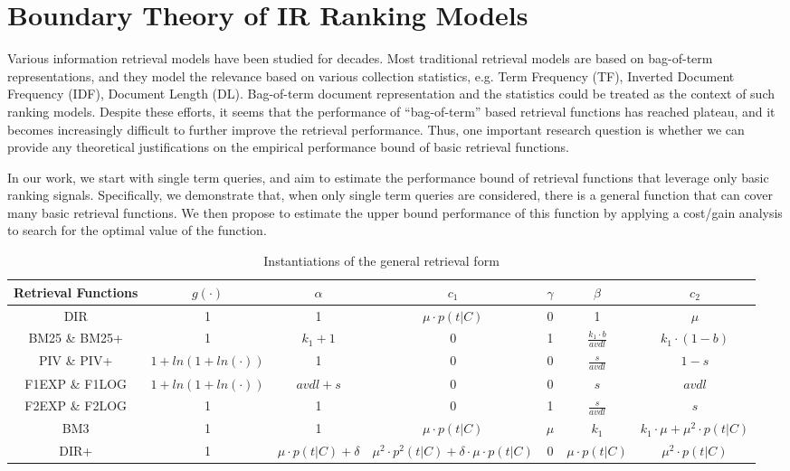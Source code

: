%
%
\chapter{Boundary Theory of IR Ranking Models}

Various information retrieval models have been studied for decades. 
Most traditional retrieval models are based on bag-of-term 
representations, and they model the relevance based on various 
collection statistics, e.g. Term Frequency (TF), 
Inverted Document Frequency (IDF), Document Length (DL). 
Bag-of-term document representation and the statistics could be 
treated as the context of such ranking models.
Despite these efforts, it seems that the performance of 
``bag-of-term'' based retrieval functions has reached plateau, 
and it becomes increasingly difficult to further improve the retrieval 
performance. Thus, one important research question is whether 
we can provide any theoretical justifications on the empirical 
performance bound of basic retrieval functions. 

In our work, we start with single term queries, and aim to
estimate the performance bound of retrieval functions that
leverage only basic ranking signals. Specifically, we demonstrate that, 
when only single term queries are considered, there is a general 
function that can cover many basic retrieval functions. We then
propose to estimate the upper bound performance of this
function by applying a cost/gain analysis to search for the
optimal value of the function.


\begin{table*}[t]
\tiny
\centering
\caption{Instantiations of the general retrieval form}
\label{tab:allmodels}
\begin{tabular}{ ccccccc } \hline
Retrieval Functions & $g(\cdot)$ & $\alpha$ & $c_1$ & $\gamma$ & $\beta$ & $c_2$ \\\hline \hline
DIR & 1 & 1 & $\mu\cdot p(t|C)$ & 0 & 1 & $\mu$ \\ \hline
BM25 \& BM25+ & 1 & $k_1+1$ & 0 & 1 & $\frac{k_1 \cdot b}{avdl}$ & $k_1 \cdot (1-b)$ \\ \hline
PIV \& PIV+ & $1+ln(1+ln(\cdot))$ & 1 & 0 & 0 & $\frac{s}{avdl}$ & $1-s$ \\ \hline
F1EXP \& F1LOG & $1+ln(1+ln(\cdot))$ & $avdl+s$ & 0 & 0 & $s$ & $avdl$ \\ \hline
F2EXP \& F2LOG & 1 & 1 & 0 & 1 & $\frac{s}{avdl}$ & $s$ \\ \hline
BM3 & 1 & 1 & $\mu \cdot p(t|C)$ & $\mu$ & $k_1$ & $k_1\cdot \mu + \mu^2 \cdot p(t|C)$ \\ \hline
DIR+ & 1 & $\mu \cdot p(t|C)+\delta$ & $\mu^2\cdot p^2(t|C)+\delta \cdot \mu \cdot p(t|C)$ & 0 & $\mu \cdot p(t|C)$ & $\mu^2 \cdot p(t|C)$ \\ \hline 
\hline
\end{tabular}
\end{table*}



